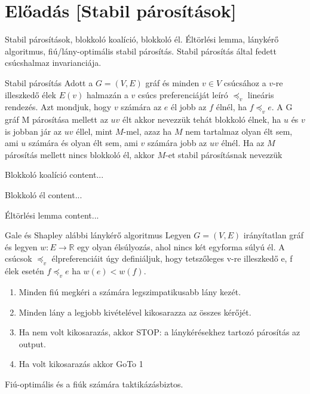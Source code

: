 	\newpage
	\section{Előadás [Stabil párosítások]}
	Stabil párosítások, blokkoló koalíció, blokkoló él. Éltörlési lemma, lánykérő algoritmus, fiú/lány-optimális stabil párosítás. Stabil párosítás által fedett csúcshalmaz invarianciája.
	
	\begin{definition}{Stabil párosítás}{}
		Adott a $G = (V, E)$ gráf és minden $v \in V$ csúcsához a $v$-re illeszkedő élek $E(v)$
		halmazán a $v$ csúcs preferenciáját leíró $\preceq_v$ lineáris rendezés. Azt mondjuk, hogy $v$ számára az
		$e$ él jobb az $f$ élnél, ha $f \preceq_v e$. A G gráf M párosítása mellett az $uv$ élt akkor nevezzük tehát
		blokkoló élnek, ha $u$ és $v$ is jobban jár az $uv$ éllel, mint $M$-mel, azaz ha $M$ nem tartalmaz
		olyan élt sem, ami $u$ számára és olyan élt sem, ami $v$ számára jobb az $uv$ élnél. Ha az $M$
		párosítás mellett nincs blokkoló él, akkor $M$-et stabil párosításnak nevezzük
	\end{definition}
	
	\begin{definition}{Blokkoló koalíció}{}
		content...
	\end{definition}
	
	\begin{definition}{Blokkoló él}{}
		content...
	\end{definition}
	
	\begin{definition}{Éltörlési lemma}{}
		content...
	\end{definition}
	
	\begin{definition}{Gale és Shapley alábbi lánykérő algoritmus}{}
		Legyen $G = (V, E)$ irányítatlan gráf és legyen $w : E \rightarrow \mathbb{R}$ egy olyan
		élsúlyozás, ahol nincs két egyforma súlyú él. A csúcsok $\preceq_v$ élpreferenciáit úgy definiáljuk, hogy
		tetszőleges v-re illeszkedő e, f élek esetén $f \preceq_v e$ ha $w(e) < w(f)$.
		\begin{enumerate}
			\item Minden fiú megkéri a számára legszimpatikusabb lány kezét.
			\item Minden lány a legjobb kivételével kikosarazza az összes kérőjét.
			\item Ha nem volt kikosarazás, akkor STOP: a lánykérésekhez tartozó párosítás az output.
			\item Ha volt kikosarazás akkor GoTo 1
		\end{enumerate}
		Fiú-optimális és a fiúk számára taktikázásbiztos.
	\end{definition}
	
